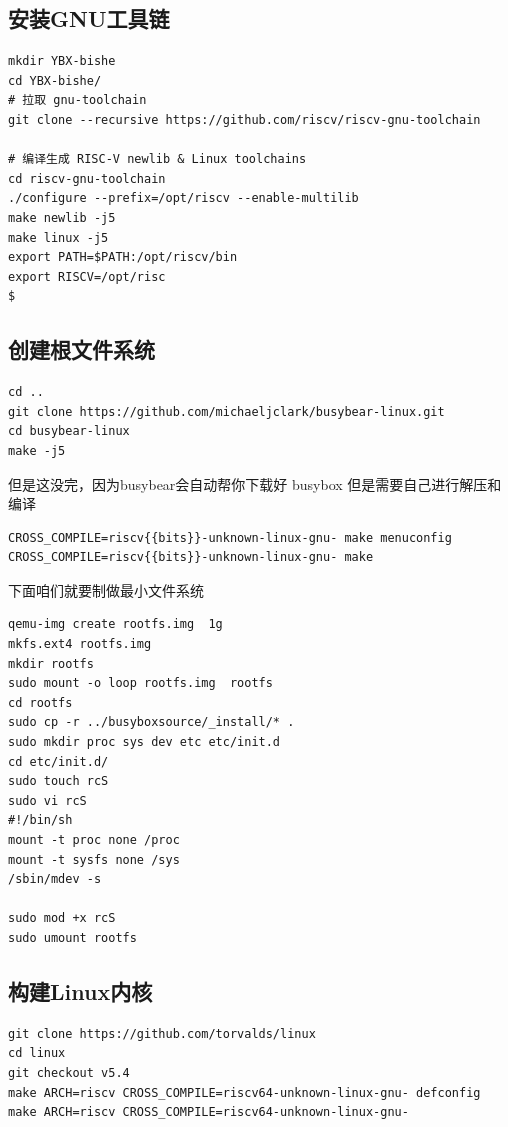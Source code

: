 \subsection{安装GNU工具链}

\begin{lstlisting}
mkdir YBX-bishe
cd YBX-bishe/
# 拉取 gnu-toolchain
git clone --recursive https://github.com/riscv/riscv-gnu-toolchain

# 编译生成 RISC-V newlib & Linux toolchains
cd riscv-gnu-toolchain
./configure --prefix=/opt/riscv --enable-multilib
make newlib -j5
make linux -j5
export PATH=$PATH:/opt/riscv/bin
export RISCV=/opt/risc
$
\end{lstlisting}

\subsection{创建根文件系统}
\begin{lstlisting}
cd ..
git clone https://github.com/michaeljclark/busybear-linux.git
cd busybear-linux
make -j5
\end{lstlisting}

但是这没完，因为busybear会自动帮你下载好 busybox 但是需要自己进行解压和编译

\begin{lstlisting}
CROSS_COMPILE=riscv{{bits}}-unknown-linux-gnu- make menuconfig
CROSS_COMPILE=riscv{{bits}}-unknown-linux-gnu- make
\end{lstlisting}

下面咱们就要制做最小文件系统
\begin{lstlisting}
qemu-img create rootfs.img  1g
mkfs.ext4 rootfs.img
mkdir rootfs
sudo mount -o loop rootfs.img  rootfs
cd rootfs
sudo cp -r ../busyboxsource/_install/* .
sudo mkdir proc sys dev etc etc/init.d
cd etc/init.d/
sudo touch rcS
sudo vi rcS
#!/bin/sh
mount -t proc none /proc
mount -t sysfs none /sys
/sbin/mdev -s

sudo mod +x rcS
sudo umount rootfs
\end{lstlisting}

\subsection{构建Linux内核}
\begin{lstlisting}
git clone https://github.com/torvalds/linux
cd linux
git checkout v5.4
make ARCH=riscv CROSS_COMPILE=riscv64-unknown-linux-gnu- defconfig
make ARCH=riscv CROSS_COMPILE=riscv64-unknown-linux-gnu-
\end{lstlisting}

